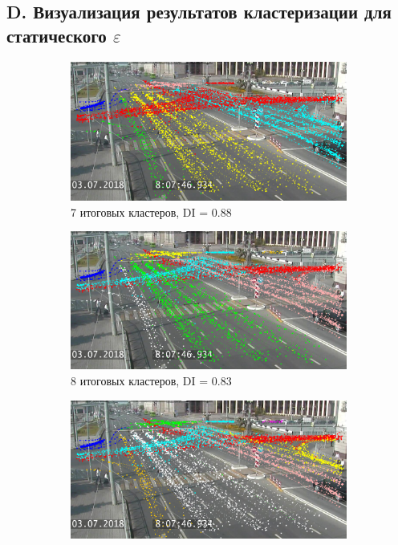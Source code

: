 \subsection*{D. Визуализация результатов кластеризации для статического $\varepsilon$}
\begin{figure}[!htb]
	\centering
	\begin{subfigure}[!htb]{0.8\textwidth}
		\centering{}
		\includegraphics[width=\textwidth]{images/cl-res/1-7cl-01.png}
		\caption{7 итоговых кластеров, DI = 0.88}
		\label{fig:1-7cl-01}
	\end{subfigure}
	\hfill
	\begin{subfigure}[!htb]{0.8\textwidth}
		\centering{}
		\includegraphics[width=\textwidth]{images/cl-res/1-8cl-01.png}
		\caption{8 итоговых кластеров, DI = 0.83}
		\label{fig:1-8cl-01}
	\end{subfigure}
	\hfill
	\begin{subfigure}[!htb]{0.8\textwidth}
		\centering{}
		\includegraphics[width=\textwidth]{images/cl-res/1-9cl-01.png}

\end{subfigure}
\end{figure}
